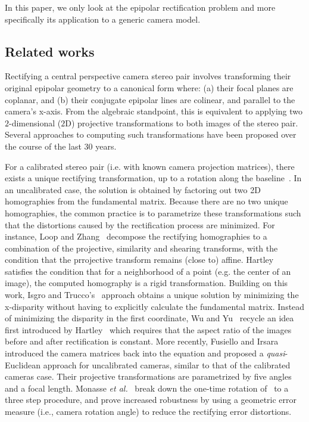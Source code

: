 \documentclass{ipol}
\begin{document}
\noindent In this paper, we only look at the epipolar rectification problem and more specifically
its application to a generic camera model.%

\subsection{Related works}
Rectifying a central perspective camera stereo pair involves transforming their original epipolar geometry to a canonical form where: (a) their focal planes are coplanar, and (b) their conjugate epipolar lines are colinear, and parallel to the camera's x-axis. 
From the algebraic standpoint, this is equivalent to applying two $2$-dimensional ($2$D) projective transformations to both images of the stereo pair. Several approaches to computing such transformations have been proposed over the course of the last 30 years.

For a calibrated stereo pair (i.e. with known camera projection matrices), there exists a unique rectifying transformation, up to a rotation along the baseline~\cite{fusiello2000epi}. In an uncalibrated case, the solution is obtained by factoring out two 2D homographies from the fundamental matrix. Because there are no two unique homographies, the common practice is to parametrize these transformations such that the distortions caused by the rectification process are minimized. For instance, Loop and Zhang~\cite{loop1999epi} decompose the rectifying homographies to a combination of the projective, similarity and shearing transforms, with the condition that the prrojective transform remains (close to) affine. Hartley~\cite{hartley1999epi} satisfies the condition that for a neighborhood of a point (e.g. the center of an image), the computed homography is a rigid transformation. Building on this work, Isgro and Trucco's~\cite{isgro1999epi} approach obtains a unique solution by minimizing the x-disparity without having to explicitly calculate the fundamental matrix. Instead of minimizing the disparity in the first coordinate, Wu and Yu~\cite{wu2005epi} recycle an idea first introduced by Hartley~\cite{hartley1999epi} which requires that the aspect ratio of the images before and after rectification is constant. More recently, Fusiello and Irsara~\cite{fusiello2008epi} introduced the camera matrices back into the equation and proposed a \textit{quasi}-Euclidean approach for uncalibrated cameras, similar to that of the calibrated cameras case. Their projective transformations are parametrized by five angles and a focal length. Monasse \textit{et al.}~\cite{monasse2010epi} break down the one-time rotation of~\cite{fusiello2008epi} to a three step procedure, and prove increased robustness by using a geometric error measure (i.e., camera rotation angle) to reduce the rectifying error distortions.
\end{document}
